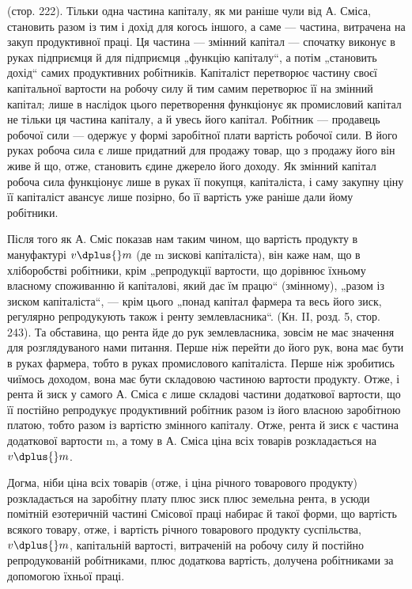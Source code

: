\parcont{}  %
 (стор. 222). Тільки одна частина капіталу, як ми
раніше чули від А. Сміса, становить разом із тим і дохід для когось
іншого, а саме — частина, витрачена на закуп продуктивної праці. Ця частина
— змінний капітал — спочатку виконує в руках підприємця й для підприємця
„функцію капіталу“, а потім „становить дохід“ самих продуктивних
робітників. Капіталіст перетворює частину своєї капітальної вартости на
робочу силу й тим самим перетворює її на змінний капітал; лише в наслідок
цього перетворення функціонує як промисловий капітал не тільки ця частина
капіталу, а й увесь його капітал. Робітник — продавець робочої сили — одержує
у формі заробітної плати вартість робочої сили. В його руках робоча
сила є лише придатний для продажу товар, що з продажу його він живе
й що, отже, становить єдине джерело його доходу. Як змінний капітал
робоча сила функціонує лише в руках її покупця, капіталіста, і саму
закупну ціну її капіталіст авансує лише позірно, бо її вартість уже раніше
дали йому робітники.

Після того як А. Сміс показав нам таким чином, що вартість продукту
в мануфактурі \deq{} $v \dplus{} m$ (де m \deq{} зискові капіталіста), він каже нам,
що в хліборобстві робітники, крім „репродукції вартости, що дорівнює
їхньому власному споживанню й капіталові, який дає їм працю“ (змінному),
„разом із зиском капіталіста“, — крім цього „понад капітал фармера
та весь його зиск, регулярно репродукують також і ренту землевласника“.
(Кн. II, розд. 5, стор. 243). Та обставина, що рента
йде до рук землевласника, зовсім не має значення для розглядуваного
нами питання. Перше ніж перейти до його рук, вона має бути в
руках фармера, тобто в руках промислового капіталіста. Перше ніж зробитись
чиїмось доходом, вона має бути складовою частиною вартости
продукту. Отже, і рента й зиск у самого А. Сміса є лише складові частини
додаткової вартости, що її постійно репродукує продуктивний робітник
разом із його власною заробітною платою, тобто разом із вартістю
змінного капіталу. Отже, рента й зиск є частина додаткової вартости
m, а тому в А. Сміса ціна всіх товарів розкладається на $v \dplus{} m$.

Догма, ніби ціна всіх товарів (отже, і ціна річного товарового продукту)
розкладається на заробітну плату плюс зиск плюс земельна рента, в
усюди помітній езотеричній частині Смісової праці набирає й такої форми,
що вартість всякого товару, отже, і вартість річного товарового продукту
суспільства, \deq{} $v \dplus{} m$, \deq{} капітальній вартості, витраченій на робочу силу
й постійно репродукованій робітниками, плюс додаткова вартість, долучена
робітниками за допомогою їхньої праці.

